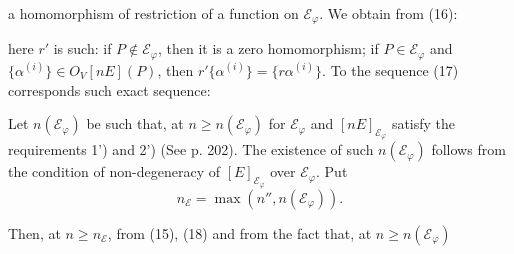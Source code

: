 
a homomorphism of restriction of a function on $\mathcal E_{\varphi}$. We obtain from (16):

here $r'$ is such: if $P\notin\mathcal E_{\varphi}$, then it is a zero homomorphism; if $P\in\mathcal E_{\varphi}$ and $\{\alpha^{(i)}\}\in O_V[nE](P)$, then $r'\{\alpha^{(i)}\}=\{r\alpha^{(i)}\}$. To the sequence (17) corresponds such exact sequence:

Let $n(\mathcal E_{\varphi})$ be such that, at $n\geq n(\mathcal E_{\varphi})$ for $\mathcal E_{\varphi}$ and $[nE]_{\mathcal E_{\varphi}}$ satisfy the requirements 1') and 2') (See p. 202). The existence of such $n(\mathcal E_{\varphi})$ follows from the condition of non-degeneracy of $[E]_{\mathcal E_{\varphi}}$ over $\mathcal E_{\varphi}$. Put
\[
n_{\mathcal E}=\max(n'',n(\mathcal E_{\varphi})).
\]

Then, at $n\geq n_{\mathcal E}$, from (15), (18) and from the fact that, at $n\geq n(\mathcal E_{\varphi})$

